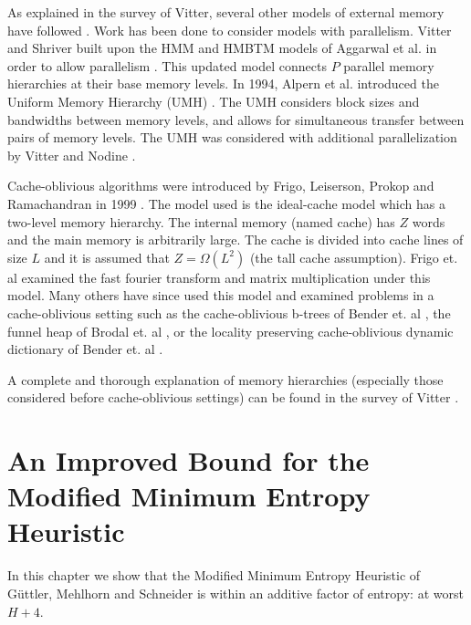 \documentclass[]{beamer}
\theoremstyle{plain}
\begin{document}
\begin{frame}
As explained in the survey of Vitter, several other models of external memory have followed \cite{vitter2001external}. Work has been done to consider models with parallelism. Vitter and Shriver built upon the HMM and HMBTM models of Aggarwal et al. \cite{aggarwal1987model, aggarwal1987hierarchical} in order to allow parallelism \cite{vitter1994algorithms}. This updated model connects $P$ parallel memory hierarchies at their base memory levels. In 1994, Alpern et al. introduced the Uniform Memory Hierarchy (UMH) \cite{alpern1994uniform}. The UMH considers block sizes and bandwidths between memory levels, and allows for simultaneous transfer between pairs of memory levels. The UMH was considered with additional parallelization by Vitter and Nodine \cite{vitter1993large}.


Cache-oblivious algorithms were introduced by Frigo, Leiserson, Prokop and Ramachandran in 1999 \cite{frigo1999cache}. The model used is the ideal-cache model which has a two-level memory hierarchy. The internal memory (named cache) has $Z$ words and the main memory is arbitrarily large. The cache is divided into cache lines of size $L$ and it is assumed that $Z=\Omega(L^2)$ (the tall cache assumption). Frigo et. al examined the fast fourier transform and matrix multiplication under this model. Many others have since used this model and examined problems in a cache-oblivious setting such as the cache-oblivious b-trees of Bender et. al \cite{bender2000cache}, the funnel heap of Brodal et. al \cite{brodai2002funnel}, or the locality preserving cache-oblivious dynamic dictionary of Bender et. al \cite{bender2002locality}.

A complete and thorough explanation of memory hierarchies (especially those considered before cache-oblivious settings) can be found in the survey of Vitter \cite{vitter2001external}.
\end{frame}


\section{An Improved Bound for the Modified Minimum Entropy Heuristic}\label{An Improved Bound for the Modified Minimum Entropy Heuristic}

\begin{frame}

In this chapter we show that the Modified Minimum Entropy Heuristic of G{\"u}ttler, Mehlhorn and Schneider \cite{guttler1980binary} is within an additive factor of entropy: at worst $H+4$.
\end{frame}
\end{document}
